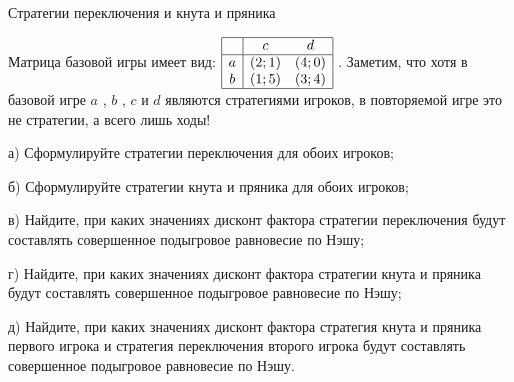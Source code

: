 \begin{problem}
 Стратегии переключения и кнута и пряника

Матрица базовой игры имеет вид:  $\begin{array}{|c|cc|}  \hline {} & {c} & {d} \\  \hline {a} & {\left(2;1\right)} & {\left(4;0\right)} \\ {b} & {\left(1;5\right)} & {\left(3;4\right)} \\  \hline  \end{array}$ .
Заметим, что хотя в базовой игре  $a$ ,  $b$ ,  $c$  и  $d$  являются стратегиями игроков, в повторяемой игре это не стратегии, а всего лишь ходы!\par
а) Сформулируйте стратегии переключения для обоих игроков;\par
б) Сформулируйте стратегии кнута и пряника для обоих игроков;\par
в) Найдите, при каких значениях дисконт фактора стратегии переключения будут составлять совершенное подыгровое равновесие по Нэшу;\par
г) Найдите, при каких значениях дисконт фактора стратегии кнута и пряника будут составлять совершенное подыгровое равновесие по Нэшу;\par
д) Найдите, при каких значениях дисконт фактора стратегия кнута и пряника первого игрока и стратегия переключения второго игрока будут составлять совершенное подыгровое равновесие по Нэшу.



\begin{sol}

\end{sol}
\end{problem}



